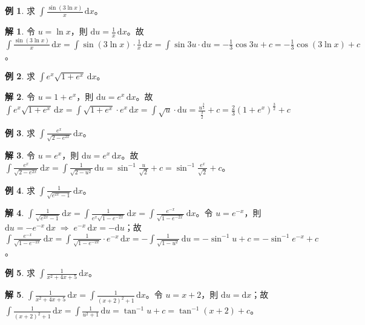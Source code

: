 \documentclass[12pt]{extarticle}
\newcommand{\ds}{\displaystyle}
\newcommand{\ie}{\;\Longrightarrow\;}
\theoremstyle{definition}
\newtheorem*{ex}{例}
\newtheorem*{sol}{解}
\begin{document}
\begin{ex}
  求 $\ds\int\!\frac{\sin(3\ln x)}{x}\,\mathrm{d}x$。
\end{ex}

\begin{sol}
  令 $\ds u = \ln x$，則 $\ds\mathrm{d}u = \frac{1}{x}\,\mathrm{d}x$。故 $\ds\int\!\frac{\sin(3\ln x)}{x}\,\mathrm{d}x = \int\!\sin(3\ln x)\cdot\frac{1}{x}\,\mathrm{d}x = \int\!\sin3u\cdot\mathrm{d}u = -\frac{1}{3}\cos 3u + c = -\frac{1}{3}\cos(3\ln x) + c$。 
\end{sol}

\begin{ex}
  求 $\ds\int e^x\sqrt{1 + e^x}\,\mathrm{d}x$。
\end{ex}

\begin{sol}
  令 $u = 1 + e^x$，則 $\ds\mathrm{d}u = e^x\,\mathrm{d}x$。故 $\ds\int e^x\sqrt{1 + e^x}\,\mathrm{d}x = \int \sqrt{1 + e^x}\cdot e^x\,\mathrm{d}x = \int\!\sqrt{u}\cdot\mathrm{d}u = \frac{u^{\frac{3}{2}}}{\frac{3}{2}} + c = \frac{2}{3}(1 + e^x)^{\frac{3}{2}} + c$
\end{sol}

\begin{ex}
  求 $\ds\int\!\frac{e^x}{\sqrt{2 - e^{2x}}}\,\mathrm{d}x$。
\end{ex}

\begin{sol}
  令 $u = e^x$，則 $\ds\mathrm{d}u = e^x\,\mathrm{d}x$。故 $\ds\int\!\frac{e^x}{\sqrt{2 - e^{2x}}}\,\mathrm{d}x = \int\!\frac{1}{\sqrt{2-u^2}}\,\mathrm{d}u = \sin^{-1}\frac{u}{\sqrt{2}} + c = \sin^{-1}\frac{e^x}{\sqrt{2}} + c$。
\end{sol}

\begin{ex}
  求 $\ds\int\!\frac{1}{\sqrt{e^{2x}-1}}\,\mathrm{d}x$。
\end{ex}

\begin{sol}
  $\ds\int\!\frac{1}{\sqrt{e^{2x}-1}}\,\mathrm{d}x = \int\!\frac{1}{e^x\sqrt{1 - e^{-2x}}}\,\mathrm{d}x = \int\!\frac{e^{-x}}{\sqrt{1 - e^{-2x}}}\,\mathrm{d}x$。令 $\ds u = e^{-x}$，則 $\ds\mathrm{d}u = -e^{-x}\,\mathrm{d}x \ie e^{-x}\,\mathrm{d}x = -\text{d}u$；故 $\ds\int\!\frac{e^{-x}}{\sqrt{1 - e^{-2x}}}\,\mathrm{d}x = \int\!\frac{1}{\sqrt{1 - e^{-2x}}}\cdot e^{-x}\,\mathrm{d}x = -\int\!\frac{1}{\sqrt{1 - u^2}}\,\mathrm{d}u = -\sin^{-1} u + c = -\sin^{-1} e^{-x} + c$。
\end{sol}

\begin{ex}
  求 $\ds\int\!\frac{1}{x^2 + 4x + 5}\,\mathrm{d}x$。
\end{ex}
\begin{sol}
  $\ds\int\!\frac{1}{x^2 + 4x + 5}\,\mathrm{d}x = \int\!\frac{1}{(x + 2)^2 + 1}\,\mathrm{d}x$。令 $\ds u = x + 2$，則 $\ds\mathrm{d}u = \mathrm{d}x$；故 $\ds\int\!\frac{1}{(x + 2)^2 + 1}\,\mathrm{d}x = \int\!\frac{1}{u^2 + 1}\,\mathrm{d}u = \tan^{-1} u + c = \tan^{-1} (x+2) + c$。
\end{sol}
\end{document}
